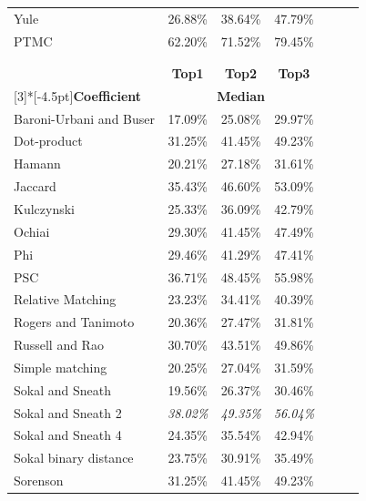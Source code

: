 \documentclass[smallextended,natbib]{svjour3}
\begin{document}
{\begin{table}[tbp]
\begin{tabular}{lcccccc}
    \rowcolor{gray!15}Yule & 26.88\% & 38.64\% & 47.79\% \\[-0.0110cm]
    \rowcolor{mycolor}PTMC & 62.20\% & 71.52\% & 79.45\% \\[-0.0110cm]
    \hline
     \rowcolor{white}\multicolumn{4}{c}{} \\    \hline
    \rowcolor{gray!50}\multicolumn{4}{c}{\textbf{MOVE METHOD}} \\
    \hline
       \rowcolor{gray!25}  & \multicolumn{1}{c}{\textbf{Top1}} & \multicolumn{1}{c}{\textbf{Top2}} & \textbf{Top3} \\
    \rowcolor{gray!25} \multirow{-2}[3]{*}[-4.5pt]{\textbf{Coefficient}} & \multicolumn{3}{c}{\textbf{Median}} \\     
    Baroni-Urbani and Buser & 17.09\% & 25.08\% & 29.97\% \\[-0.0110cm]
    \rowcolor{gray!15}Dot-product & 31.25\% & 41.45\% & 49.23\% \\[-0.0110cm]
    Hamann & 20.21\% & 27.18\% & 31.61\% \\[-0.0110cm]
    \rowcolor{gray!15}Jaccard & 35.43\% & 46.60\% & 53.09\% \\[-0.0110cm]
    Kulczynski & 25.33\% & 36.09\% & 42.79\% \\[-0.0110cm]
    \rowcolor{gray!15}Ochiai & 29.30\% & 41.45\% & 47.49\% \\[-0.0110cm]
    Phi & 29.46\% & 41.29\% & 47.41\% \\[-0.0110cm]
    \rowcolor{gray!15}PSC & 36.71\% & 48.45\% & 55.98\% \\[-0.0110cm]
    Relative Matching & 23.23\% & 34.41\% & 40.39\% \\[-0.0110cm]
    \rowcolor{gray!15}Rogers and Tanimoto & 20.36\% & 27.47\% & 31.81\% \\[-0.0110cm]
    Russell and Rao & 30.70\% & 43.51\% & 49.86\% \\[-0.0110cm]
    \rowcolor{gray!15}Simple matching & 20.25\% & 27.04\% & 31.59\% \\[-0.0110cm]
    Sokal and Sneath & 19.56\% & 26.37\% & 30.46\% \\[-0.0110cm]
    \rowcolor{gray!15}Sokal and Sneath 2 & \textit{38.02\%} & \textit{49.35\%} & \textit{56.04\%} \\[-0.0110cm]
    Sokal and Sneath 4 & 24.35\% & 35.54\% & 42.94\% \\[-0.0110cm]
    \rowcolor{gray!15}Sokal binary distance & 23.75\% & 30.91\% & 35.49\% \\[-0.0110cm]
    Sorenson & 31.25\% & 41.45\% & 49.23\% \\[-0.0110cm]

\end{tabular}
\end{table}}
\end{document}
